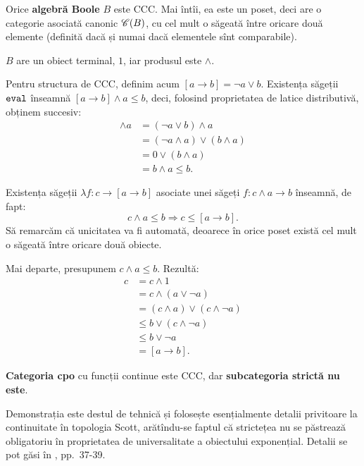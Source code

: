 \documentclass[12pt, a4paper]{article}
\begin{document}
\vspace{1cm}

Orice \textbf{algebră Boole} $ B $ este CCC. Mai întîi, ea este un poset, deci are o categorie
asociată canonic $ \mathscr{C}(B) $, cu cel mult o săgeată între oricare două elemente
(definită dacă și numai dacă elementele sînt comparabile).

$ B $ are un obiect terminal, $ 1 $, iar produsul este $ \land $.

Pentru structura de CCC, definim acum $ [a \to b] = \lnot a \lor b $. Existența
săgeții $ \texttt{eval} $ înseamnă $ [a \to b] \land a \leq b $, deci, folosind
proprietatea de latice distributivă, obținem succesiv:
\begin{align*}
  [a \to b] \land a &= (\lnot a \lor b) \land a \\
                     &= (\lnot a \land a) \lor (b \land a) \\
                     &= 0 \lor (b \land a) \\
                     &= b \land a \leq b.
\end{align*}

Existența săgeții $ \lambda f : c \to [a \to b] $ asociate unei săgeți $ f : c \land a \to b $
înseamnă, de fapt:
\[
  c \land a \leq b \Rightarrow c \leq [a \to b].
\]
Să remarcăm că unicitatea va fi automată, deoarece în orice poset există cel mult o
săgeată între oricare două obiecte.

Mai departe, presupunem $ c \land a \leq b $. Rezultă:
\begin{align*}
  c &= c \land 1 \\
    &= c \land (a \lor \lnot a) \\
    &= (c \land a) \lor (c \land \lnot a) \\
    &\leq b \lor (c \land \lnot a) \\
    &\leq  b \lor \lnot a \\
    &= [a \to b].
\end{align*}

\vspace{1cm}

\textbf{Categoria cpo} cu funcții continue este CCC, dar \textbf{subcategoria strictă nu este}.

Demonstrația este destul de tehnică și folosește esențialmente detalii privitoare
la continuitate în topologia Scott, arătîndu-se faptul că strictețea nu se
păstrează obligatoriu în proprietatea de universalitate a obiectului exponențial.
Detalii se pot găsi în \cite{rey}, pp.\ 37-39.
\end{document}
